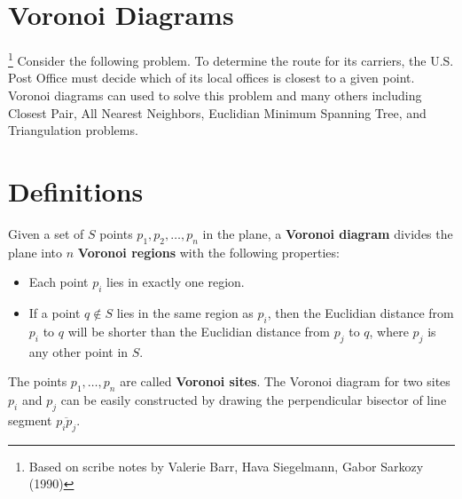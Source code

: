 

\bigskip 
\bigskip 

\section{Voronoi Diagrams}
\footnote{Based on scribe notes by Valerie Barr, Hava Siegelmann, Gabor Sarkozy (1990)}
Consider the following problem.  To determine the route for its
carriers, the U.S. Post Office must decide which of its local offices
is closest to a given point. Voronoi diagrams can used to solve this
problem and many others including Closest Pair, All Nearest Neighbors,
Euclidian Minimum Spanning Tree, and Triangulation problems.

\begin{center}
\end{center}


\section{Definitions}

Given a set of $S$ points $p_1, p_2, \ldots, p_n$ in the plane, a {\bf
Voronoi diagram} divides the plane into $n$ {\bf Voronoi regions} with
the following properties:
\begin{itemize}
\item Each point $p_i$ lies in exactly one region.

\item If a point $q \notin S$ lies in the same region as $p_i$, then
the Euclidian distance from $p_i$ to $q$ will be shorter than the
Euclidian distance from $p_j$ to $q$, where $p_j$ is any other point
in $S$.
\end{itemize}

The points $p_1, \ldots, p_n$ are called {\bf Voronoi sites}.  The
Voronoi diagram for two sites $p_i$ and $p_j$ can be easily
constructed by drawing the perpendicular bisector of line segment
$\overline{p_i p_j}$.

\begin{center}
\end{center}


